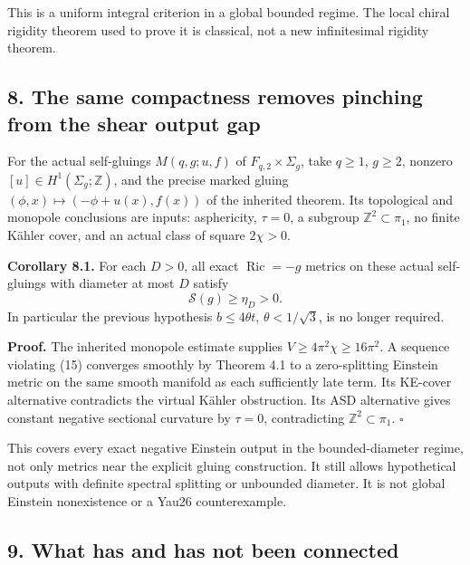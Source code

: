 \documentclass[
  11pt,
]{article}
\begin{document}
This is a uniform integral criterion in a global bounded regime. The
local chiral rigidity theorem used to prove it is classical, not a new
infinitesimal rigidity theorem.

\hypertarget{the-same-compactness-removes-pinching-from-the-shear-output-gap}{%
\subsection{8. The same compactness removes pinching from the shear
output
gap}\label{the-same-compactness-removes-pinching-from-the-shear-output-gap}}

For the actual self-gluings \(M(q,g;u,f)\) of \(F_{q,2}\times\Sigma_g\),
take \(q\ge1\), \(g\ge2\), nonzero \([u]\in H^1(\Sigma_g;\mathbb Z)\),
and the precise marked gluing \((\phi,x)\mapsto(-\phi+u(x),f(x))\) of
the inherited theorem. Its topological and monopole conclusions are
inputs: asphericity, \(\tau=0\), a subgroup \(\mathbb Z^2\subset\pi_1\),
no finite Kähler cover, and an actual class of square \(2\chi>0\).

\textbf{Corollary 8.1.} For each \(D>0\), all exact
\(\operatorname{Ric}=-g\) metrics on these actual self-gluings with
diameter at most \(D\) satisfy \[
                              \mathscr S(g)\ge\eta_D>0.    \tag{15}
\] In particular the previous hypothesis \(b\le4\theta t\),
\(\theta<1/\sqrt3\), is no longer required.

\textbf{Proof.} The inherited monopole estimate supplies
\(V\ge4\pi^2\chi\ge16\pi^2\). A sequence violating (15) converges
smoothly by Theorem 4.1 to a zero-splitting Einstein metric on the same
smooth manifold as each sufficiently late term. Its KE-cover alternative
contradicts the virtual Kähler obstruction. Its ASD alternative gives
constant negative sectional curvature by \(\tau=0\), contradicting
\(\mathbb Z^2\subset\pi_1\). \(\square\)

This covers every exact negative Einstein output in the bounded-diameter
regime, not only metrics near the explicit gluing construction. It still
allows hypothetical outputs with definite spectral splitting or
unbounded diameter. It is not global Einstein nonexistence or a Yau26
counterexample.

\hypertarget{what-has-and-has-not-been-connected}{%
\subsection{9. What has and has not been
connected}\label{what-has-and-has-not-been-connected}}
\end{document}

